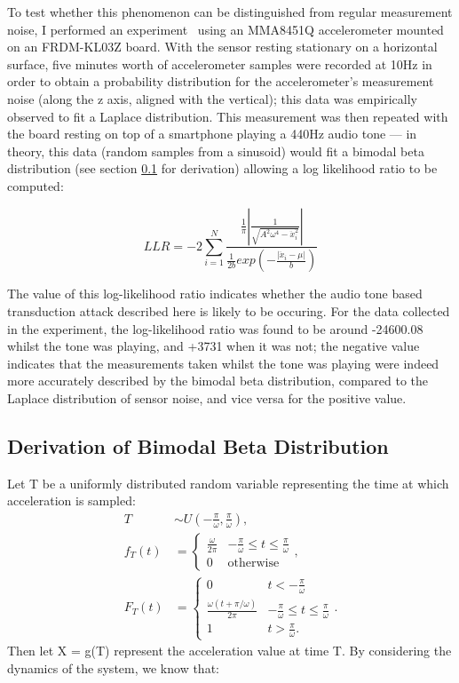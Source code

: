 \documentclass[12pt]{article}
\begin{document}
\begin{appendix}
    To test whether this phenomenon can be distinguished from regular measurement noise, I performed an experiment~\cite{poster_experiment} using an MMA8451Q accelerometer mounted on an FRDM-KL03Z board. With the sensor resting stationary on a horizontal surface, five minutes worth of accelerometer samples were recorded at 10Hz in order to obtain a probability distribution for the accelerometer's measurement noise (along the z axis, aligned with the vertical); this data was empirically observed to fit a Laplace distribution. This measurement was then repeated with the board resting on top of a smartphone playing a 440Hz audio tone --- in theory, this data (random samples from a sinusoid) would fit a bimodal beta distribution (see section \ref{Poster_Derivation} for derivation) allowing a log likelihood ratio to be computed:

    \begin{equation}
      LLR = -2 \sum_{i = 1}^{N} \frac{\frac{1}{\pi}\left| \frac{1}{\sqrt{A^2\omega^4 - \ddot{x}_i^2}} \right|}{\frac{1}{2b} exp\left(-\frac{|\ddot{x}_i-\mu|}{b}\right)}
    \end{equation}

    The value of this log-likelihood ratio indicates whether the audio tone based transduction attack described here is likely to be occuring. For the data collected in the experiment, the log-likelihood ratio was found to be around -24600.08 whilst the tone was playing, and +3731 when it was not; the negative value indicates that the measurements taken whilst the tone was playing were indeed more accurately described by the bimodal beta distribution, compared to the Laplace distribution of sensor noise, and vice versa for the positive value.

    \subsection{Derivation of Bimodal Beta Distribution} \label{Poster_Derivation}
    Let T be a uniformly distributed random variable representing the time at which acceleration is sampled:
    \begin{align}
      T & \sim U\left(-\frac{\pi}{\omega}, \frac{\pi}{\omega}\right), \nonumber \\
      f_T(t) & =
        \begin{cases}
          \frac{\omega}{2\pi} & -\frac{\pi}{\omega} \leq t \leq \frac{\pi}{\omega}\\
          0 & \text{otherwise}
        \end{cases},\\
      F_T(t) & =
        \begin{cases}
          0 & t < -\frac{\pi}{\omega}\\
          \frac{\omega (t + \pi / \omega)}{2\pi} & -\frac{\pi}{\omega} \leq t \leq \frac{\pi}{\omega}\\
          1 & t > \frac{\pi}{\omega}.
        \end{cases}.
    \end{align}
    Then let X = g(T) represent the acceleration value at time T. By considering the dynamics of the system, we know that:


\end{appendix}
\end{document}
